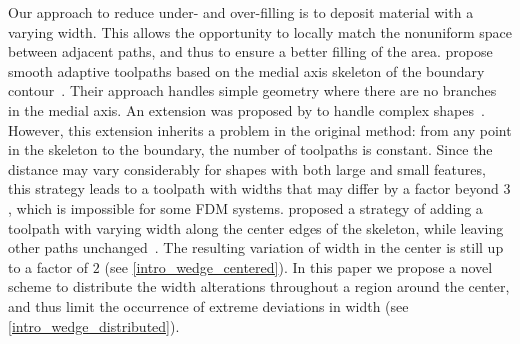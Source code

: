 Our approach to reduce under- and over-filling is to deposit material with a varying width.
This allows the opportunity to locally match the nonuniform space between adjacent paths, and thus to ensure a better filling of the area.
\citeauthor{kao1998optimal} propose smooth adaptive toolpaths based on the medial axis skeleton of the boundary contour~\cite{kao1998optimal}.
Their approach handles simple geometry where there are no branches in the medial axis.
An extension was proposed by \citeauthor{Ding2016a} to handle complex shapes~\cite{Ding2016a}.
However, this extension inherits a problem in the original method:
from any point in the skeleton to the boundary, the number of toolpaths is constant.
Since the distance may vary considerably for shapes with both large and small features, this strategy leads to a toolpath with widths that may differ by a factor beyond $3$, which is impossible for some FDM systems.
\citeauthor{Jin2017JMS} proposed a strategy of adding a toolpath with varying width along the center edges of the skeleton, while leaving other paths unchanged~\cite{Jin2017JMS}.
The resulting variation of width in the center is still up to a factor of $2$ (see \cref{intro_wedge_centered}).
In this paper we propose a novel scheme to distribute the width alterations throughout a region around the center, and thus limit the occurrence of extreme deviations in width (see \cref{intro_wedge_distributed}).







